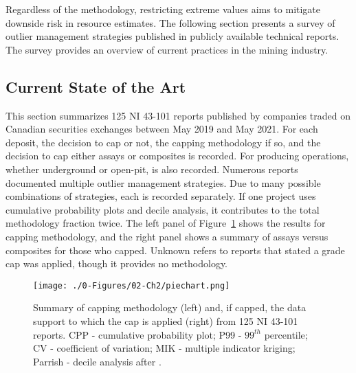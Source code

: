 
Regardless of the methodology, restricting extreme values aims to mitigate downside risk in resource estimates. The following section presents a survey of outlier management strategies published in publicly available technical reports. The survey provides an overview of current practices in the mining industry.

\subsection{Current State of the Art}
\label{subsec:02state}

This section summarizes 125 \gls{NI} 43-101 reports published by companies traded on Canadian securities exchanges between May 2019 and May 2021. For each deposit, the decision to cap or not, the capping methodology if so, and the decision to cap either assays or composites is recorded. For producing operations, whether underground or open-pit, is also recorded. Numerous reports documented multiple outlier management strategies. Due to many possible combinations of strategies, each is recorded separately. If one project uses cumulative probability plots and decile analysis, it contributes to the total methodology fraction twice. The left panel of Figure~\ref{fig:piechart} shows the results for capping methodology, and the right panel shows a summary of assays versus composites for those who capped. Unknown refers to reports that stated a grade cap was applied, though it provides no methodology.

\begin{figure}[htb!]
    \centering
    \texttt{[image: ./0-Figures/02-Ch2/piechart.png]}
    \caption{Summary of capping methodology (left) and, if capped, the data support to which the cap is applied (right) from 125 \gls{NI} 43-101 reports. CPP - cumulative probability plot; P99 - $99^{th}$ percentile; CV - coefficient of variation; MIK - multiple indicator kriging; Parrish - decile analysis after \cite{parrish1997geologist}.}
    \label{fig:piechart}
\end{figure}

